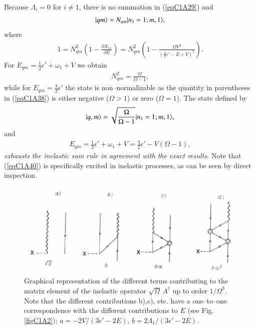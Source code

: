 Because $\Lambda_i=0$ for $i\neq 1$, there is no summation in (\ref{eqC1A29}) and
 \begin{align}\label{eqC1A37} 
|{qm} \rangle=N_{qm}|{n_1=1;m,1} \rangle,
 \end{align}
where
 \begin{align}\label{eqC1A38} 
1=N^2_{qm}\left(1-\frac{\partial X_{11}}{\partial E}\right)=N^2_{qm}\left(1-\frac{\Omega V^2}{\left(\frac{3}{2}\epsilon'-E+V\right)^2}\right).
 \end{align}
For $E_{qm}=\frac{1}{2}\epsilon'+\omega_1+V$ we obtain
 \begin{align}\label{eqC1A39} 
 N^2_{qm}=\frac{\Omega}{\Omega-1},
 \end{align}
while for $E_{qm}=\frac{3}{2}\epsilon'$ the state is non--normalizable as the quantity in parentheses
in (\ref{eqC1A38}) is either negative ($\Omega>1$) or zero ($\Omega=1$).
The state defined by
 \begin{align}\label{eqC1A40} 
|{q,m} \rangle=\sqrt{\frac{\Omega}{\Omega-1}}|{n_1=1;m,1} \rangle,
 \end{align}
and 
 \begin{align}\label{eqC1A41} 
E_{qm}=\frac{1}{2}\epsilon'+\omega_1+V=\frac{3}{2}\epsilon'-V(\Omega-1),
 \end{align}
\textit{exhausts the inelastic sum rule in agreement with the exact results.} Note
that (\ref{eqC1A40}) is specifically excited in inelastic processes, as can be seen by
direct inspection.
  \begin{figure}
  \centerline {
  \includegraphics*[width=12cm]{introduccion/figs/fig20}
  }
  \caption[Graphical representation of the different terms contributing to the matrix element of the inelastic operator $\sqrt{\Omega}\,A^\dagger$ up to order $1/\Omega^3$.]{Graphical representation of the different terms contributing to the matrix element of the inelastic operator $\sqrt{\Omega}\,A^\dagger$ up to order $1/\Omega^3$. Note that the different contributions b),c), etc. have a one--to--one correspondence with the different contributions to $E$ (see Fig. \ref{figC1A2}); $a=-2V/(3\epsilon'-2E),\,b=2\Lambda_1/(3\epsilon'-2E)$.}
  \label{figC1A3}
  \end{figure}
